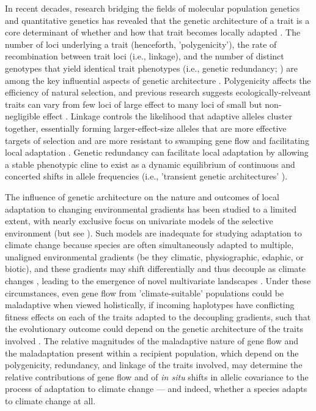 \documentclass[9pt,twocolumn,twoside,lineno]{pnas-new}
\begin{document}
In recent decades, research bridging the fields
of molecular population genetics
and quantitative genetics
\cite{barghi_polygenic,barton,pritchard_human_adaptation,pritchard_sweeps_alone}
has revealed that the genetic architecture of a trait
is a core determinant of whether and how that trait
becomes locally adapted \cite{yeaman_review}.
The number of loci underlying a trait (henceforth, 'polygenicity'),
the rate of recombination between trait loci (i.e., linkage),
and the number of distinct genotypes that yield identical trait phenotypes
(i.e., genetic redundancy; \cite{yeaman_review,laruson,barghi_polygenic})
are among the key influential aspects of genetic architecture
\cite{barton,yeaman_whitlock,yeaman_review,lecorre}.
Polygenicity affects the efficiency of natural selection,
and previous research suggests ecologically-relveant traits can vary from
few loci of large effect
\cite{martin,rees}
to many loci of small but non-negligible effect
\cite{boyle,rockman,savolainen,sella,barghi_polygenic}.
Linkage controls the likelihood that adaptive alleles cluster together,
essentially forming larger-effect-size alleles that are more 
effective targets of selection and are more resistant
to swamping gene flow \cite{yeaman_whitlock}
and facilitating local adaptation \cite{tigano}.
Genetic redundancy can facilitate local adaptation 
by allowing a stable phenotypic cline to exist as a dynamic equilibrium
of continuous and concerted shifts in allele frequencies
(i.e., 'transient genetic architectures' \cite{barghi_redundancy,manceau,yeaman_amnat}).

The influence of genetic architecture on the nature and outcomes
of local adaptation to changing environmental gradients
has been studied to a limited extent,
with nearly exclusive focus on univariate models
of the selective environment (but see \cite{schiffers}).
Such models are inadequate for studying adaptation to climate change
because species are often simultaneously adapted to multiple, unaligned environmental gradients
(be they climatic, physiographic, edaphic, or biotic),
and these gradients may shift differentially and thus decouple as climate changes
\cite{crimmins,daly},
leading to the emergence of novel multivariate landscapes
\cite{williams_novel_climates,williams_projected_novel_disappearing,fitzpatrick_climate_novelty_forecasts}.
Under these circumstances,
even gene flow from 'climate-suitable' populations
could be maladaptive when viewed holistically, if
incoming haplotypes have conflicting fitness effects
on each of the traits adapted to the decoupling gradients,
such that the evolutionary outcome could depend on
the genetic architecture of the traits involved
\cite{aitken_whitlock,schiffers}.
The relative magnitudes of the maladaptive nature of gene flow
and the maladaptation present within a recipient population,
which depend on the polygenicity, redundancy, and linkage of the traits involved,
may determine the relative contributions of gene flow
and of \textit{in situ} shifts in allelic covariance
to the process of adaptation to climate change --- and indeed,
whether a species adapts to climate change at all.
\end{document}
